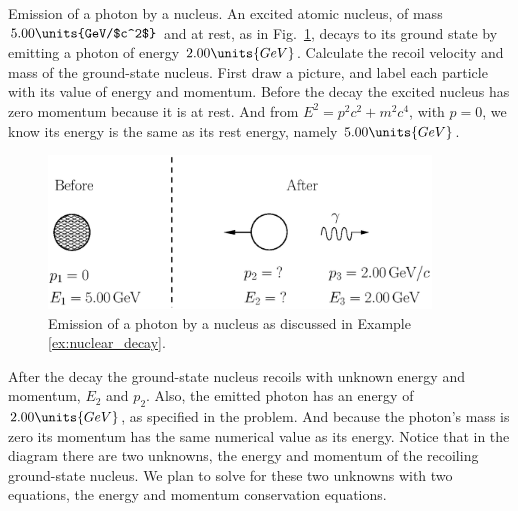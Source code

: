\begin{example}{Emission of a photon by a nucleus.}
\label{ex:nuclear_decay}
An excited atomic
nucleus, of mass $5.00\units{GeV/$c^2$}$ and at rest, as in
Fig.~\ref{fig:photon_emission2}, decays to its ground state by
emitting a photon of energy $2.00\units{GeV}$.  Calculate the recoil
velocity and mass of the ground-state nucleus.
\solution
First draw a picture, and label each particle with its value of
energy and momentum.  Before the decay the excited nucleus has zero
momentum because it is at rest.  And from $E^2 = p^2c^2 + m^2c^4$, with 
$p =0$, we know its energy is the same as its rest energy, namely 
$5.00\units{GeV}$.

\begin{figure}[tbp]
\begin{center}
\includegraphics[width=4in]{relativity_conservation/photon_emission2.eps}
\end{center}
\caption{Emission of a photon by a nucleus as discussed in Example 
\ref{ex:nuclear_decay}.}
\label{fig:photon_emission2}
\end{figure}

After the decay the ground-state nucleus recoils with unknown energy
and momentum, $E_2$ and $p_2$.  Also, the emitted photon has an energy
of $2.00\units{GeV}$, as specified in the problem.  And because the
photon's mass is zero its momentum has the same numerical value as its
energy.  Notice that in the diagram there are two unknowns, the
energy and momentum of the recoiling ground-state nucleus.  We plan to
solve for these two unknowns with two equations, the energy and
momentum conservation equations.
     

\end{example}
